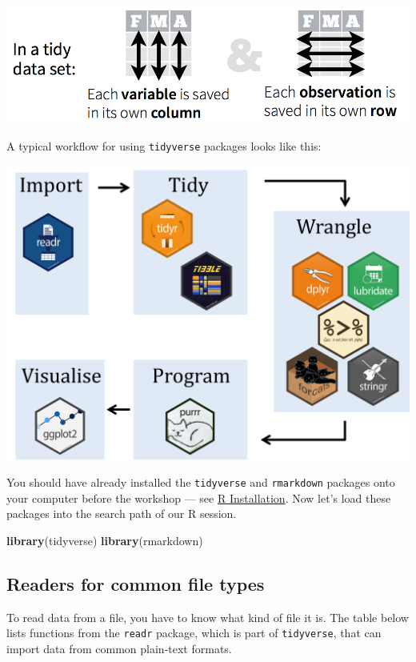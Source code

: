 \documentclass[
]{book}
\newenvironment{Shaded}{\begin{snugshade}}{\end{snugshade}}
\newcommand{\KeywordTok}[1]{\textcolor[rgb]{0.13,0.29,0.53}{\textbf{#1}}}
\newcommand{\NormalTok}[1]{#1}
\begin{document}
\includegraphics{R/Rintro/images/tidy_data.png}

A typical workflow for using \texttt{tidyverse} packages looks like this:

\includegraphics{R/Rintro/images/tidy_workflow.png}

You should have already installed the \texttt{tidyverse} and \texttt{rmarkdown}
packages onto your computer before the workshop
--- see \href{./Rinstall.html}{R Installation}.
Now let's load these packages into the search path of our R session.

\begin{Shaded}
\begin{Highlighting}[]
\KeywordTok{library}\NormalTok{(tidyverse)}
\KeywordTok{library}\NormalTok{(rmarkdown)}
\end{Highlighting}
\end{Shaded}

\hypertarget{readers-for-common-file-types}{%
\subsection{Readers for common file types}\label{readers-for-common-file-types}}

To read data from a file, you have to know what kind of file
it is. The table below lists functions from the \texttt{readr} package, which
is part of \texttt{tidyverse}, that can import data from common plain-text formats.
\end{document}
